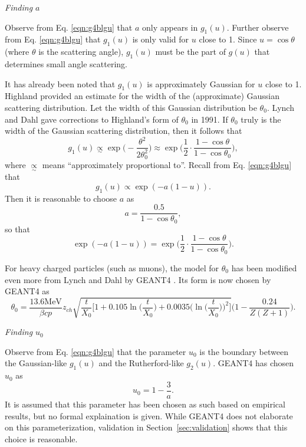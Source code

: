 \noindent \textit{\large{Finding $a$}}

Observe from Eq. \eqref{eqn:g4blgu} that $a$ only appears in $g_1(u)$. Further observe from Eq. \eqref{eqn:g4blgu} that $g_1(u)$ is only valid for $u$ close to 1. Since $u=\cos\theta$ (where $\theta$ is the scattering angle), $g_1(u)$ must be the part of $g(u)$ that determines small angle scattering. 

It has already been noted that $g_1(u)$ is approximately Gaussian for $u$ close to 1. Highland \cite{highland} provided an estimate for the width of the (approximate) Gaussian scattering distribution. Let the width of this Gaussian distribution be $\theta_0$. Lynch and Dahl \cite{lynchdahl} gave corrections to Highland's form of $\theta_0$ in 1991. If $\theta_0$ truly is the width of the Gaussian scattering distribution, then it follows that
%
\begin{equation}\nonumber
g_1(u) \underset{\sim}{\propto} \exp{\Big(-\frac{\theta^2}{2\theta_0^2}\Big)} \approx \exp\Big(\frac{1}{2}\cdot\frac{1-\cos\theta}{1-\cos\theta_0}\Big),
\end{equation}
%
where $\underset{\sim}{\propto}$ means ``approximately proportional to''. Recall from Eq. \eqref{eqn:g4blgu} that
\begin{equation}\nonumber
g_1(u)\propto \exp{(-a(1-u))}.
\end{equation}
Then it is reasonable to choose $a$ as
%
\begin{equation}
a=\frac{0.5}{1-\cos\theta_0},
\label{eqn:geanta}
\end{equation}
%
so that
%
\begin{equation}\nonumber
\exp{(-a(1-u))}=\exp\Big(\frac{1}{2}\cdot\frac{1-\cos\theta}{1-\cos\theta_0}\Big).
\end{equation}
%

 For heavy charged particles (such as muons), the model for $\theta_0$ has been modified even more from Lynch and Dahl by GEANT4 \cite{geant4}. Its form is now chosen by GEANT4 \cite{geant4} as
%
\begin{equation}\label{g4bltheta0}
\theta_0=\frac{13.6 \text{MeV}}{\beta c p}z_{ch}\sqrt{\frac{t}{X_0}\Big[ 1+0.105\ln\Big(\frac{t}{X_0}\Big)+0.0035\Big(\ln\Big(\frac{t}{X_0}\Big)\Big)^2 \Big]}\Big(1-\frac{0.24}{Z(Z+1)}\Big).
\end{equation}

\noindent \textit{\large{Finding $u_0$}}

Observe from Eq. \eqref{eqn:g4blgu} that the parameter $u_0$ is the boundary between the Gaussian-like $g_1(u)$ and the Rutherford-like $g_2(u)$. GEANT4 \cite{geant4} has chosen $u_0$ as
\begin{equation}
u_0=1-\frac{3}{a}.
\label{eqn:geantu0}
\end{equation}
It is assumed that this parameter has been chosen as such based on empirical results, but no formal explaination is given. While GEANT4 \cite{geant4} does not elaborate on this parameterization, validation in Section~\ref{sec:validation} shows that this choice is reasonable.

